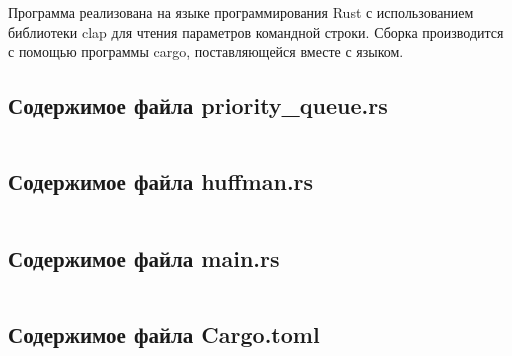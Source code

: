 \documentclass[a4paper,oneside]{article}
\theoremstyle{definition}
\begin{document}
Программа реализована на языке программирования Rust с использованием библиотеки
clap для чтения параметров командной строки. Сборка производится с помощью
программы cargo, поставляющейся вместе с языком.

\subsection{Содержимое файла priority\_queue.rs}
\inputminted{rust}{../../lab5/src/priority_queue.rs}

\subsection{Содержимое файла huffman.rs}
\inputminted{rust}{../../lab5/src/huffman.rs}

\subsection{Содержимое файла main.rs}
\inputminted{rust}{../../lab5/src/main.rs}

\subsection{Содержимое файла Cargo.toml}
\inputminted{toml}{../../lab5/Cargo.toml}
\end{document}
